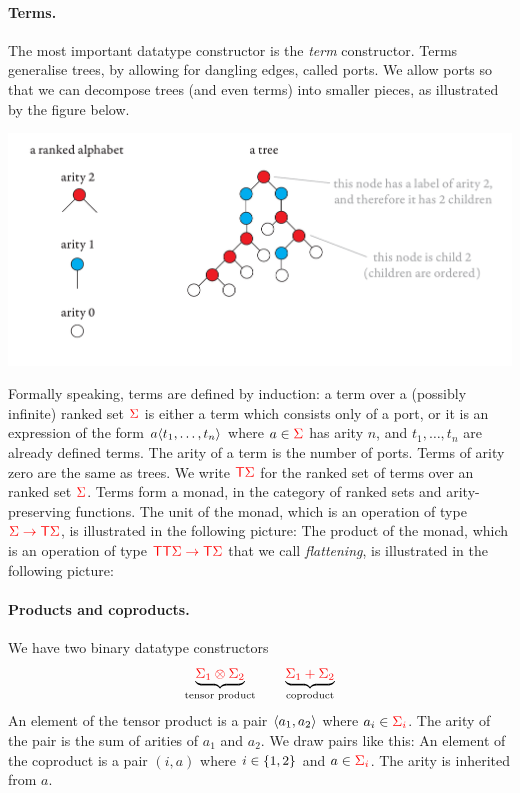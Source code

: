 \paragraph*{Terms.} The most important datatype constructor is the  \emph{term} constructor. Terms generalise trees, by allowing for dangling edges, called ports. We allow ports so that we can decompose trees (and even terms) into smaller pieces, as  illustrated by the figure below. 
\begin{center}
\includegraphics[scale=.32, page=15]{pics.pdf}
\end{center}
Formally speaking, terms are defined by induction: a term over a (possibly infinite) ranked set ${\color{red}{\Sigma}}$ is either a term which consists only of a port, 
or it is an expression of the  form $a \langle{t_1,\ldots,t_n}\rangle$ where $a \in {\color{red}{\Sigma}}$ has arity $n$, and $t_1,\ldots,t_n$ are already defined terms. The arity of a term is the number of ports. Terms of arity zero are the same as trees. We write ${\color{red}{\mathsf T}} {\color{red}{\Sigma}}$ for the ranked set of terms over an ranked set ${\color{red}{\Sigma}}$.    Terms form a monad, in the category of ranked sets and arity-preserving functions. The unit of the monad, which is an operation of type ${\color{red}{{\color{red}{\Sigma}}\to {\color{red}{\mathsf T}}{\color{red}{\Sigma}}}}$, is illustrated in the following picture:
The product of the monad, which is an operation of type ${\color{red}{{\color{red}{\mathsf T}}{\color{red}{\mathsf T}}{\color{red}{\Sigma}}\to {\color{red}{\mathsf T}}{\color{red}{\Sigma}}}}$ that we call \emph{flattening}, is illustrated in the following picture:

\paragraph*{Products and coproducts.}
We have two binary datatype constructors
\begin{align*}
\underbrace{{\color{red}{\Sigma_1 \otimes \Sigma_2}}}_{\text{tensor product}} \qquad \underbrace{{\color{red}{\Sigma_1 + \Sigma_2}}}_{\text{coproduct}}
\end{align*}
An element of the tensor product is a pair $\langle{a_1,a_2}\rangle$ where $a_i \in {\color{red}{\Sigma_i}}$. The arity of the pair is the sum of arities of $a_1$ and $a_2$. We draw pairs like this:
An element of the coproduct is a pair $(i,a)$ where $i \in \{1,2\}$ and $a \in {\color{red}{\Sigma_i}}$. The arity is inherited from $a$. 

